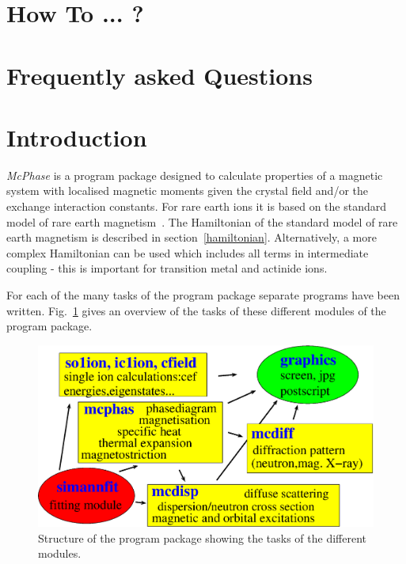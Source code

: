 \documentclass[twoside]{article}
\newcommand{\prg}{\sl}
\begin{document}
\newpage

\tableofcontents

\clearpage

\section{How To ... ? }


\section{Frequently asked Questions}


\clearpage
\section{Introduction}

{\prg McPhase} is a program package designed to calculate 
properties of a magnetic system with localised magnetic moments
given the crystal field and/or the
exchange interaction constants.
For rare earth ions it is based on the standard model
of rare earth magnetism~\cite{jensen91-1}.
The Hamiltonian of the standard model of rare earth magnetism 
is described in section~\ref{hamiltonian}.
Alternatively, a more complex Hamiltonian can be used which includes
all terms in intermediate coupling - this is important for transition metal
and actinide ions.

 

For each of the many tasks of the program package separate programs have been written.
Fig.~\ref{modules} gives an overview of the 
tasks of these different modules of the program package.


\begin{figure}[hb]\begin{center}
\includegraphics[angle=0,width=0.7\columnwidth]{figsrc/mcphas_modules.eps}
\caption{\label{modules}
Structure of the program package showing the tasks of the different modules.}
\end{center}
\end{figure}
\end{document}
